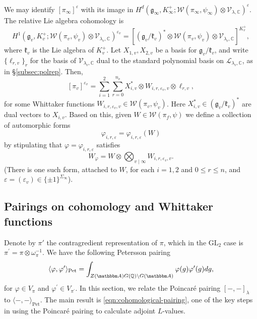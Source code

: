 \documentclass[10pt, twoside]{amsart}
\theoremstyle{plain}
\theoremstyle{definition}
\theoremstyle{remark}
\numberwithin{equation}{subsection}
\def\Q{\mathbb Q}
\def\C{\mathbb C}
\def\A{\mathbbm A}
\def\GL{\mathrm{GL}}
\def\Pet{\mathrm{Pet}}
\def\calw{\mathcal W}
\def\scrl{\mathscr L}
\def\scrv{\mathscr V}
\begin{document}
We may identify $[\pi_\infty]^\varepsilon$ with its image in $H^d (\mathfrak g_\infty, K_\infty^+; \calw (\pi_\infty, \psi_\infty) \otimes \scrv_{\lambda, \C})^\varepsilon$. The relative Lie algebra cohomology is
$$
H^1 (\mathfrak g_v, K_v^+; \calw(\pi_v,\psi_v) \otimes \scrv_{\lambda_v, \C})^{\varepsilon_v} = \left[ (\mathfrak g_v/\mathfrak k_v)^* \otimes \calw (\pi_v,\psi_v) \otimes \scrv_{\lambda_v, \C} \right]^{K_v^+},
$$
where $\mathfrak k_v$ is the Lie algebra of $K_v^+$. Let $X_{1,v}, X_{2,v}$ be a basis for $\mathfrak g_v/\mathfrak k_v$, and write $\{\ell_{r, v}\}_r$ for the basis of $\scrv_{\lambda_v,\C}$ dual to the standard polynomial basis on $\scrl_{\lambda_v,\C}$, as in \S\ref{subsec:polrep}. Then,
$$
[\pi_v]^{\varepsilon_v} = \sum_{i=1}^2 \sum_{r= 0}^{n_v} X_{i,v}^* \otimes W_{i, r, \varepsilon_v, v} \otimes \ell_{r, v},
$$
for some Whittaker functions $W_{i, r, \varepsilon_v, v} \in \calw (\pi_v,\psi_v)$. Here $X_{i,v}^* \in (\mathfrak g_v/\mathfrak k_v)^*$ are dual vectors to $X_{i, v}$. Based on this, given $W \in \calw(\pi_f,\psi)$ we define a collection of automorphic forms
\begin{equation*}
\varphi_{i,r,\varepsilon} = \varphi_{i,r,\varepsilon}(W)
\end{equation*}
by stipulating that $\varphi = \varphi_{i,r,\varepsilon}$ satisfies
\begin{equation*}
W_{\varphi} = W \otimes \bigotimes_{v \mid \infty} W_{i,r,\varepsilon_v,v}.
\end{equation*}
(There is one such form, attached to $W$, for each $i=1,2$ and $0 \leq r \leq n$, and $\varepsilon = (\varepsilon_v) \in \{\pm 1\}^{\Sigma_\infty}$).

\subsection{Pairings on cohomology and Whittaker functions}\label{subsec:whittaker}
Denote by $\pi'$ the contragredient representation of $\pi$, which in the $\GL_2$ case is  
$\pi^\prime = \pi \otimes \omega_{\pi}^{-1}$. We have the following Petersson pairing 
$$
\langle \varphi , \varphi^\prime \rangle_{\mathrm{Pet}} = \int_{Z(\A) G(\Q) \backslash G(\A) } \varphi (g) \varphi^\prime (g) dg, 
$$
for $\varphi \in V_\pi$ and $\varphi^\prime \in V_{\pi^\prime}$. In this section, we relate the Poincar\'e pairing $[-,-]_{\lambda}$ to $\langle - , - \rangle_{\Pet}$. The main result is \eqref{eqn:cohomological-pairing}, one of the key steps in using the Poincar\'e pairing to calculate adjoint $L$-values.
\end{document}
